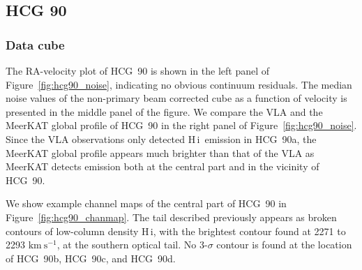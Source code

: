 \documentclass{aa}
\newcommand{\HI}{H\,{\sc i}}
\begin{document}
\subsection{HCG 90}
\subsubsection{Data cube}
The RA-velocity plot of HCG~90 is shown in the left panel of Figure~\ref{fig:hcg90_noise}, indicating no obvious continuum residuals. The median noise values of the non-primary 
beam corrected cube as a function of velocity is presented in the middle panel of the figure. We compare the VLA and the MeerKAT global profile of HCG~90 in the right panel of 
Figure~\ref{fig:hcg90_noise}. Since the VLA observations only detected \HI\ emission in HCG~90a, the MeerKAT global profile appears much brighter than that of the VLA as MeerKAT 
detects emission both at the central part and in the vicinity of HCG~90. 

We show example channel maps of the central part of HCG~90 in Figure~\ref{fig:hcg90_chanmap}. The tail described previously appears as broken contours of low-column density \HI, with the 
brightest contour found at 2271 to 2293 $\mathrm{km~s^{-1}}$, at the southern optical tail. No 3-$\sigma$ contour is found at the location of HCG~90b, HCG~90c, and HCG~90d.  
\end{document}
